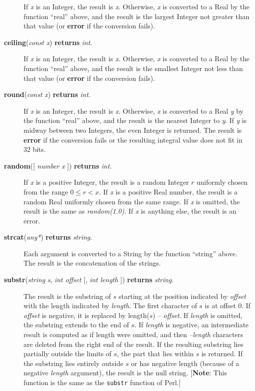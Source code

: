 \documentclass{article}
\begin{document}
\begin{description}
If \emph{x} is an Integer, the result is \emph{x}.
Otherwise, \emph{x} is converted to a Real by the function ``real'' above,
and the result is the largest Integer not greater than that value (or
\textbf{error} if the conversion fails).

\item[\textbf{ceiling}(\emph{const x}) \textbf{returns} \emph{int}.]

If \emph{x} is an Integer, the result is \emph{x}.
Otherwise, \emph{x} is converted to a Real by the function ``real'' above,
and the result is the smallest Integer not less than that value (or
\textbf{error} if the conversion fails).

\item[\textbf{round}(\emph{const x}) \textbf{returns} \emph{int}.]

If \emph{x} is an Integer, the result is \emph{x}.
Otherwise, \emph{x} is converted to a Real \emph{y} by the function ``real''
above, and the result is the nearest Integer to \emph{y}.  If \emph{y} is
midway between two Integers, the even Integer is returned.  The result is
\textbf{error} if the conversion fails or the resulting integral value does not
fit in 32 bits.

\item[\textbf{random}({[} \emph{number x} {]}) \textbf{returns} \emph{int}.]

If \emph{x} is a positive Integer, the result is a random Integer $r$ uniformly
chosen from the range $0 \le r < x$.  If \emph{x} is a positive Real number, the
result is a random Real uniformly chosen from the same range.   If \emph{x} is
omitted, the result is the same as \emph{random(1.0)}.  If \emph{x} is anything
else, the result is an error.

\item[\textbf{strcat}(\emph{any*}) \textbf{returns} \emph{string}.]

Each argument is converted to a String by the
function ``string'' above.  The result is the concatenation of the strings.

\item[\textbf{substr}(\emph{string s}, \emph{int offset}
{[}, \emph{int length} {]}) \textbf{returns} \emph{string}.]
The result is the substring of $s$ starting
at the position indicated by \emph{offset} with the length indicated by
\emph{length}.
The first character of $s$ is at offset 0.
If \emph{offset} is negative, it is replaced by length($s$) -- \emph{offset}.
If \emph{length} is omitted, the substring
extends to the end of $s$.  If \emph{length} is negative, an intermediate 
result is computed as if length were omitted, and then \emph{--length}
characters are deleted from the right end of the result.
If the resulting substring lies partially
outside the limits of $s$, the part that lies within $s$ is returned.
If the substring lies entirely outside $s$ or has negative length (because
of a negative \emph{length} argument), the result is the null string.
[\textbf{Note}:  This function is the same as the \texttt{substr} function
of Perl.]


\end{description}
\end{document}
